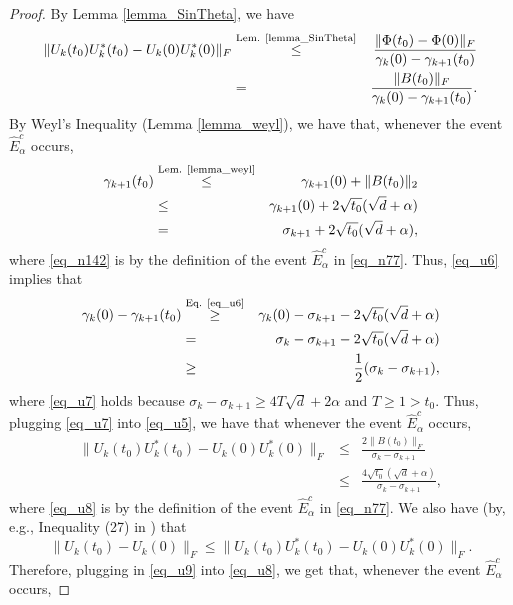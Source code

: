 \documentclass[11pt,letterpaper]{article}
\begin{document}
\begin{proof}
By Lemma \ref{lemma_SinTheta}, we have
%
\begin{eqnarray}\label{eq_u5}
 \|U_k(t_0)U_k^\ast(t_0) -U_k(0)U_k^\ast(0)\|_F  &\stackrel{\textrm{Lem. \ref{lemma_SinTheta}}}{\leq}  &\frac{\|\Phi(t_0) - \Phi(0)\|_F}{\gamma_k(0) - \gamma_{k+1}(t_0)}\nonumber\\
 &=&  \frac{\|B(t_0)\|_F}{\gamma_k(0) - \gamma_{k+1}(t_0)}.
\end{eqnarray}
%
By Weyl's Inequality (Lemma \ref{lemma_weyl}), we have that, whenever the event  $\hat{E}^c_\alpha$ occurs,
%
\begin{eqnarray}\label{eq_u6}
\gamma_{k+1}(t_0) &\stackrel{\textrm{Lem. \ref{lemma_weyl}}}{\leq} & \gamma_{k+1}(0) + \|B(t_0)\|_2\nonumber\\
%
&\leq & \gamma_{k+1}(0) + 2\sqrt{t_0}(\sqrt{d} + \alpha) \label{eq_n142}\\
%
&= & \sigma_{k+1} + 2\sqrt{t_0}(\sqrt{d} + \alpha),
%
\end{eqnarray}
%
where \eqref{eq_n142} is by the definition of the event $\hat{E}^c_\alpha$ in \eqref{eq_n77}.
%
Thus, \eqref{eq_u6} implies that
%
\begin{eqnarray}
\gamma_k(0)-\gamma_{k+1}(t_0) &\stackrel{\textrm{Eq. \ref{eq_u6}}}{\geq} & \gamma_k(0)- \sigma_{k+1} - 2\sqrt{t_0}(\sqrt{d} + \alpha)\nonumber\\
%
&= & \sigma_k - \sigma_{k+1} - 2\sqrt{t_0}(\sqrt{d} + \alpha)\nonumber\\
%
&\geq & \frac{1}{2}(\sigma_k - \sigma_{k+1}), \label{eq_u7}
\end{eqnarray}
%
where \eqref{eq_u7} holds because $\sigma_k - \sigma_{k+1} \geq 4T \sqrt{d} + 2\alpha$ and $T \geq 1> t_0$.
%
Thus, plugging \eqref{eq_u7} into \eqref{eq_u5}, we have that whenever the event  $\hat{E}^c_\alpha$ occurs,
%
\begin{eqnarray}
 \|U_k(t_0)U_k^\ast(t_0) -U_k(0)U_k^\ast(0)\|_F  &\leq  & \frac{2\|B(t_0)\|_F}{\sigma_k - \sigma_{k+1}}\\
 &\leq & \frac{4\sqrt{t_0}(\sqrt{d} + \alpha)}{\sigma_k - \sigma_{k+1}}, \label{eq_u8}
\end{eqnarray}
where \eqref{eq_u8} is by the definition of the event $\hat{E}^c_\alpha$ in \eqref{eq_n77}.
%   
We also have (by, e.g., Inequality (27) in \cite{mangoubi2022private}) that
%
\begin{equation}\label{eq_u9}
    \|U_k(t_0) -U_k(0)\|_F \leq \|U_k(t_0)U_k^\ast(t_0) -U_k(0)U_k^\ast(0)\|_F.
\end{equation}
%
Therefore, plugging in \eqref{eq_u9} into \eqref{eq_u8}, we get that, whenever the event  $\hat{E}^c_\alpha$ occurs,

\end{proof}
\end{document}
